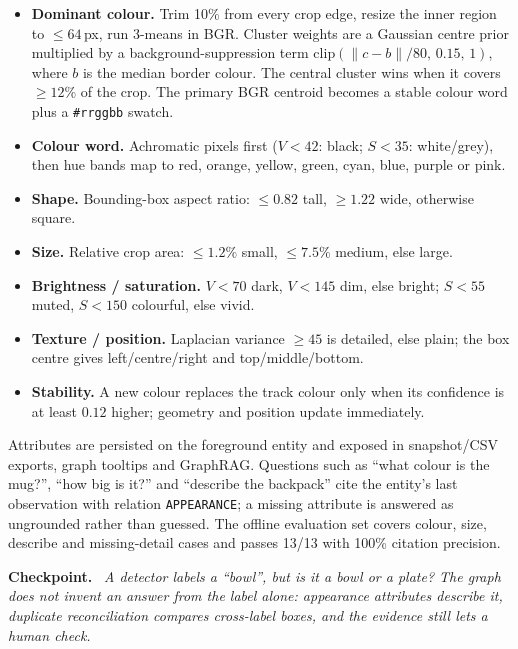 \documentclass[10pt,a4paper]{article}
\newcommand{\code}[1]{\texttt{\small #1}}
\newenvironment{checkpoint}
  {\par\medskip\noindent\colorbox{accent!5}\bgroup
     \begin{minipage}{\dimexpr\linewidth-2\fboxsep\relax}
     \vspace{3pt}\textbf{\textcolor{accent}{Checkpoint.}}\ \itshape}
  {\vspace{3pt}\end{minipage}\egroup\par\medskip}
\begin{document}
\begin{itemize}[leftmargin=1.2em,itemsep=1pt]
  \item \textbf{Dominant colour.} Trim 10\% from every crop edge, resize the inner region to
        \(\leq 64\)\,px, run 3-means in BGR. Cluster weights are a Gaussian centre prior multiplied
        by a background-suppression term
        \(\mathrm{clip}(\lVert c-b\rVert/80,\,0.15,\,1)\), where \(b\) is the median border colour.
        The central cluster wins when it covers \(\geq 12\%\) of the crop. The primary BGR centroid
        becomes a stable colour word plus a \code{\#rrggbb} swatch.
  \item \textbf{Colour word.} Achromatic pixels first (\(V<42\): black; \(S<35\): white/grey), then
        hue bands map to red, orange, yellow, green, cyan, blue, purple or pink.
  \item \textbf{Shape.} Bounding-box aspect ratio: \(\leq 0.82\) tall, \(\geq 1.22\) wide,
        otherwise square.
  \item \textbf{Size.} Relative crop area: \(\leq 1.2\%\) small, \(\leq 7.5\%\) medium, else large.
  \item \textbf{Brightness / saturation.} \(V<70\) dark, \(V<145\) dim, else bright; \(S<55\)
        muted, \(S<150\) colourful, else vivid.
  \item \textbf{Texture / position.} Laplacian variance \(\geq 45\) is detailed, else plain; the box
        centre gives left/centre/right and top/middle/bottom.
  \item \textbf{Stability.} A new colour replaces the track colour only when its confidence is at
        least \(0.12\) higher; geometry and position update immediately.
\end{itemize}

\noindent
Attributes are persisted on the foreground entity and exposed in snapshot/CSV exports, graph
tooltips and GraphRAG. Questions such as ``what colour is the mug?'', ``how big is it?'' and
``describe the backpack'' cite the entity's last observation with relation \code{APPEARANCE}; a
missing attribute is answered as ungrounded rather than guessed. The offline evaluation set covers
colour, size, describe and missing-detail cases and passes 13/13 with 100\% citation precision.

\begin{checkpoint}
A detector labels a ``bowl'', but is it a bowl or a plate? \emph{The graph does not invent an answer
from the label alone: appearance attributes describe it, duplicate reconciliation compares
cross-label boxes, and the evidence still lets a human check.}
\end{checkpoint}
\end{document}

